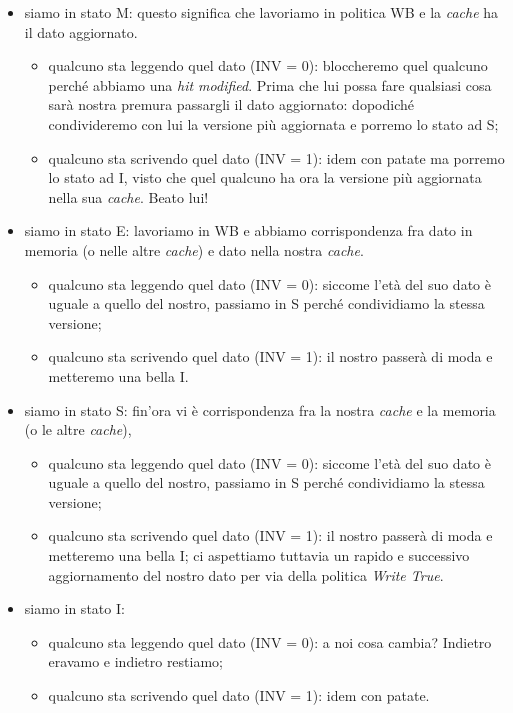\begin{itemize}
\item siamo in stato M: questo significa che lavoriamo in politica WB e la \textit{cache} ha il dato aggiornato. 
\begin{itemize}
\item qualcuno sta leggendo quel dato (INV = 0): bloccheremo quel qualcuno perché abbiamo una \textit{hit modified}. Prima che lui possa fare qualsiasi cosa sarà nostra premura passargli il dato aggiornato: dopodiché condivideremo con lui la versione più aggiornata e porremo lo stato ad S;
\item qualcuno sta scrivendo quel dato (INV = 1): idem con patate ma porremo lo stato ad I, visto che quel qualcuno ha ora la versione più aggiornata nella sua \textit{cache}. Beato lui! 
\end{itemize}
\item siamo in stato E: lavoriamo in WB e abbiamo corrispondenza fra dato in memoria (o nelle altre \textit{cache}) e dato nella nostra\textit{ cache}. 
\begin{itemize}
\item qualcuno sta leggendo quel dato (INV = 0): siccome l'età del suo dato è uguale a quello del nostro, passiamo in S perché condividiamo la stessa versione;
\item qualcuno sta scrivendo quel dato (INV = 1): il nostro passerà di moda e metteremo una bella I.
\end{itemize}
\item siamo in stato S: fin'ora vi è corrispondenza fra la nostra \textit{cache} e la memoria (o le altre \textit{cache}),
\begin{itemize}
\item qualcuno sta leggendo quel dato (INV = 0): siccome l'età del suo dato è uguale a quello del nostro, passiamo in S perché condividiamo la stessa versione;
\item qualcuno sta scrivendo quel dato (INV = 1): il nostro passerà di moda e metteremo una bella I; ci aspettiamo tuttavia un rapido e successivo aggiornamento del nostro dato per via della politica \textit{Write True}.
\end{itemize} 
\item siamo in stato I: 
\begin{itemize}
\item qualcuno sta leggendo quel dato (INV = 0): a noi cosa cambia? Indietro eravamo e indietro restiamo;
\item qualcuno sta scrivendo quel dato (INV = 1): idem con patate.
\end{itemize}
\end{itemize}

